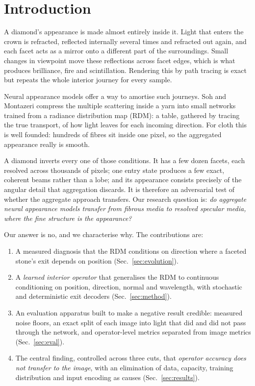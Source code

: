 \documentclass[conference]{IEEEtran}
\begin{document}
\section{Introduction}

A diamond's appearance is made almost entirely inside it. Light that enters the
crown is refracted, reflected internally several times and refracted out again,
and each facet acts as a mirror onto a different part of the surroundings. Small
changes in viewpoint move these reflections across facet edges, which is what
produces brilliance, fire and scintillation. Rendering this by path tracing is
exact but repeats the whole interior journey for every sample.

Neural appearance models offer a way to amortise such journeys. Soh and Montazeri
\cite{soh2024} compress the multiple scattering inside a yarn into small networks
trained from a radiance distribution map (RDM): a table, gathered by tracing the
true transport, of how light leaves for each incoming direction. For cloth this is
well founded: hundreds of fibres sit inside one pixel, so the aggregated
appearance really is smooth.

A diamond inverts every one of those conditions. It has a few dozen facets, each
resolved across thousands of pixels; one entry state produces a few exact,
coherent beams rather than a lobe; and its appearance consists precisely of the
angular detail that aggregation discards. It is therefore an adversarial test of
whether the aggregate approach transfers. Our research question is:
\emph{do aggregate neural appearance models transfer from fibrous media to
resolved specular media, where the fine structure is the appearance?}

Our answer is no, and we characterise why. The contributions are:
\begin{enumerate}
\item A measured diagnosis that the RDM conditions on direction where a faceted
stone's exit depends on position (Sec.~\ref{sec:evolution}).
\item A \emph{learned interior operator} that generalises the RDM to continuous
conditioning on position, direction, normal and wavelength, with stochastic and
deterministic exit decoders (Sec.~\ref{sec:method}).
\item An evaluation apparatus built to make a negative result credible: measured
noise floors, an exact split of each image into light that did and did not pass
through the network, and operator-level metrics separated from image metrics
(Sec.~\ref{sec:eval}).
\item The central finding, controlled across three cuts, that \emph{operator
accuracy does not transfer to the image}, with an elimination of data, capacity,
training distribution and input encoding as causes (Sec.~\ref{sec:results}).
\end{enumerate}
\end{document}
